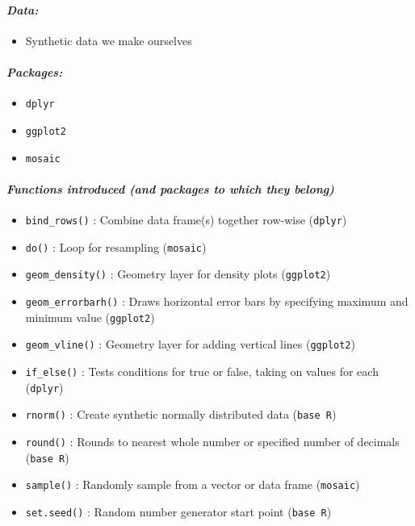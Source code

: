 \documentclass[
]{book}
\providecommand{\tightlist}{%
  \setlength{\itemsep}{0pt}\setlength{\parskip}{0pt}}
\begin{document}
\hypertarget{data-4}{%
\paragraph*{\texorpdfstring{\emph{Data:}}{Data:}}\label{data-4}}

\begin{itemize}
\tightlist
\item
  Synthetic data we make ourselves
\end{itemize}

\hypertarget{packages-5}{%
\paragraph*{\texorpdfstring{\emph{Packages:}}{Packages:}}\label{packages-5}}

\begin{itemize}
\tightlist
\item
  \texttt{dplyr}
\item
  \texttt{ggplot2}
\item
  \texttt{mosaic}
\end{itemize}

\hypertarget{functions-introduced-and-packages-to-which-they-belong-4}{%
\paragraph*{\texorpdfstring{\emph{Functions introduced (and packages to which they belong)}}{Functions introduced (and packages to which they belong)}}\label{functions-introduced-and-packages-to-which-they-belong-4}}

\begin{itemize}
\tightlist
\item
  \texttt{bind\_rows()} : Combine data frame(s) together row-wise (\texttt{dplyr})
\item
  \texttt{do()} : Loop for resampling (\texttt{mosaic})
\item
  \texttt{geom\_density()} : Geometry layer for density plots (\texttt{ggplot2})
\item
  \texttt{geom\_errorbarh()} : Draws horizontal error bars by specifying maximum and minimum value (\texttt{ggplot2})
\item
  \texttt{geom\_vline()} : Geometry layer for adding vertical lines (\texttt{ggplot2})
\item
  \texttt{if\_else()} : Tests conditions for true or false, taking on values for each (\texttt{dplyr})
\item
  \texttt{rnorm()} : Create synthetic normally distributed data (\texttt{base\ R})
\item
  \texttt{round()} : Rounds to nearest whole number or specified number of decimals (\texttt{base\ R})
\item
  \texttt{sample()} : Randomly sample from a vector or data frame (\texttt{mosaic})
\item
  \texttt{set.seed()} : Random number generator start point (\texttt{base\ R})
\end{itemize}
\end{document}
